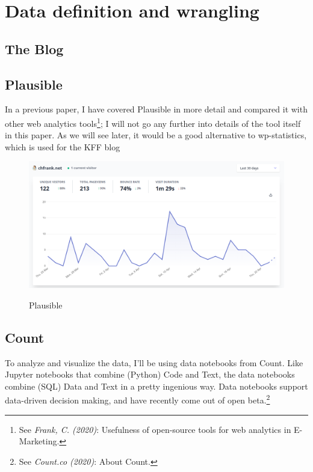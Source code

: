 %
%

\pagebreak
\section{Data definition and wrangling}

\onehalfspacing

\subsection{The Blog}

\subsection{Plausible}

In a previous paper, I have covered Plausible in more detail and compared it with other web analytics tools\footnote{See \textit{Frank, C. (2020)}: Usefulness of open-source tools for web analytics in E-Marketing.\cite{previousPaper}}; I will not go any further into details of the tool itself in this paper. As we will see later, it would be a good alternative to wp-statistics, which is used for the KFF blog

\begin{figure}[H]
\centering
\caption {Plausible}
\includegraphics[width=\linewidth]{images/plausible.png}
\label{fig:plausible}
\end{figure}

\subsection{Count}

To analyze and visualize the data, I'll be using data notebooks from Count. Like Jupyter notebooks that combine (Python) Code and Text, the data notebooks combine (SQL) Data and Text in a pretty ingenious way. Data notebooks support data-driven decision making, and have recently come out of open beta.\footnote{See \textit{Count.co (2020)}: About Count.\cite{aboutCount}}


